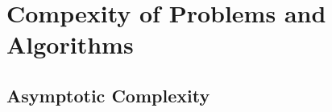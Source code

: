 
\chapter{Compexity of Problems and Algorithms}
\label{cha:comp-probl-algor}

\section{Asymptotic Complexity}
\label{sec:asympt-compl}



